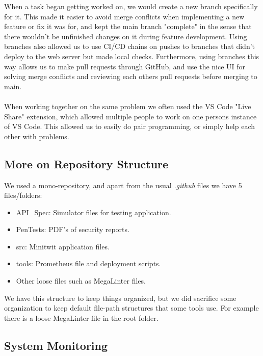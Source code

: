 When a task began getting worked on, we would create a new branch specifically for it. This made it easier to avoid merge conflicts when implementing a new feature or fix it was for, and kept the main branch "complete" in the sense that there wouldn't be unfinished changes on it during feature development. Using branches also allowed us to use CI/CD chains on pushes to branches that didn't deploy to the web server but made local checks. Furthermore, using branches this way allows us to make pull requests through GitHub, and use the nice UI for solving merge conflicts and reviewing each others pull requests before merging to main.
\\\\
When working together on the same problem we often used the VS Code "Live Share" extension, which allowed multiple people to work on one persons instance of VS Code. This allowed us to easily do pair programming, or simply help each other with problems.

\subsection*{More on Repository Structure}

We used a mono-repository, and apart from the usual \textit{.github} files we have 5 files/folders:

\begin{itemize}
    \item API\_Spec: Simulator files for testing application.
    \item PenTests: PDF's of security reports.
    \item src: Minitwit application files.
    \item tools: Prometheus file and deployment scripts.
    \item Other loose files such as MegaLinter files.
\end{itemize}

We have this structure to keep things organized, but we did sacrifice some organization to keep default file-path structures that some tools use. For example there is a loose MegaLinter file in the root folder.

\subsection*{System Monitoring}


